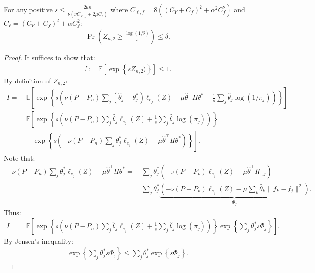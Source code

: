 \documentclass[12pt]{extarticle} %
\newcommand{\E}{\mathbb{E}}
\begin{document}
\begin{lemma}\label{lem:z2}
For any positive $s\leq \frac{2 \mu n}{\nu (\nu C_{\ell,f} + 2 \mu C_{\ell})}$ where $C_{\ell,f} = 8((C_Y+C_f)^2+\alpha^2C_f^2)$ and $C_{\ell} = (C_Y+C_f)^2+\alpha C_f^2$:
\begin{align*}
    \Pr\left(Z_{n,2} \geq \frac{\log(1/\delta)}{s}\right) \leq \delta.
\end{align*}
\end{lemma}
\begin{proof}
It suffices to show that:
\begin{align*}
    I := \E\left[\exp\left\{s Z_{n,2})\right\}\right] \leq 1.
\end{align*}
By definition of $Z_{n,2}$:
\begin{align*}
    I =~& \E\left[\exp\left\{s \left( \nu(P-P_n) \sum_{j} (\hat{\theta}_j-\theta_j^*)\ell_{e_j}(Z) - \mu \hat{\theta}^\top H \theta^*  -\frac{1}{s}\sum_j\hat{\theta}_j \log(1/\pi_j) \right)\right\}\right]\\
    =~& \E\left[\exp\left\{s \left( \nu(P-P_n) \sum_{j} \hat{\theta}_j \ell_{e_j}(Z) + \frac{1}{s}\sum_j\hat{\theta}_j \log(\pi_j)\right)\right\}\right.\\
    ~&\quad \left.\exp\left\{s\left( - \nu (P-P_n)\sum_{j} \theta_j^*\ell_{e_j}(Z) - \mu \hat{\theta}^\top H \theta^* \right)\right\}\right].
\end{align*}
Note that:
\begin{align*}
    - \nu (P-P_n)\sum_{j} \theta_j^*\ell_{e_j}(Z) - \mu \hat{\theta}^\top H \theta^* =~& \sum_{j} \theta_j^* \left( -\nu (P-P_n) \ell_{e_j}(Z) - \mu \hat{\theta}^\top H_{\cdot, j}\right) \\
    =~& \sum_{j} \theta_j^* \underbrace{\left( -\nu (P-P_n) \ell_{e_j}(Z) - \mu \sum_{k} \hat{\theta}_k \|f_k - f_j\|^2\right)}_{\Phi_j}.
\end{align*}
Thus:
\begin{align*}
    I=~&  \E\left[\exp\left\{s \left( \nu(P-P_n) \sum_{j} \hat{\theta}_j \ell_{e_j}(Z)  +\frac{1}{s}\sum_j\hat{\theta}_j \log(\pi_j)\right)\right\} \exp\left\{\sum_{j}\theta_j^* s\Phi_j\right\}\right].
\end{align*}
By Jensen's inequality:
\begin{align*}
    \exp\left\{\sum_{j}\theta_j^* s\Phi_j\right\} \leq \sum_{j}\theta_j^* \exp\left\{s\Phi_j\right\}.

\end{align*}
\end{proof}
\end{document}
